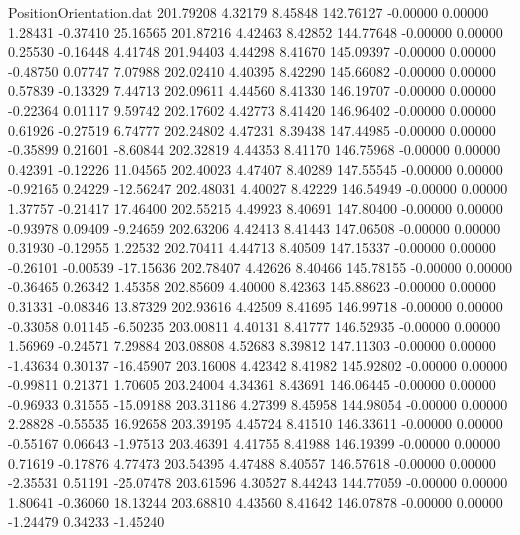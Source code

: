 \begin{filecontents}{PositionOrientation.dat}
 201.79208    4.32179    8.45848   142.76127   -0.00000    0.00000    1.28431   -0.37410   25.16565
 201.87216    4.42463    8.42852   144.77648   -0.00000    0.00000    0.25530   -0.16448    4.41748
 201.94403    4.44298    8.41670   145.09397   -0.00000    0.00000   -0.48750    0.07747    7.07988
 202.02410    4.40395    8.42290   145.66082   -0.00000    0.00000    0.57839   -0.13329    7.44713
 202.09611    4.44560    8.41330   146.19707   -0.00000    0.00000   -0.22364    0.01117    9.59742
 202.17602    4.42773    8.41420   146.96402   -0.00000    0.00000    0.61926   -0.27519    6.74777
 202.24802    4.47231    8.39438   147.44985   -0.00000    0.00000   -0.35899    0.21601   -8.60844
 202.32819    4.44353    8.41170   146.75968   -0.00000    0.00000    0.42391   -0.12226   11.04565
 202.40023    4.47407    8.40289   147.55545   -0.00000    0.00000   -0.92165    0.24229  -12.56247
 202.48031    4.40027    8.42229   146.54949   -0.00000    0.00000    1.37757   -0.21417   17.46400
 202.55215    4.49923    8.40691   147.80400   -0.00000    0.00000   -0.93978    0.09409   -9.24659
 202.63206    4.42413    8.41443   147.06508   -0.00000    0.00000    0.31930   -0.12955    1.22532
 202.70411    4.44713    8.40509   147.15337   -0.00000    0.00000   -0.26101   -0.00539  -17.15636
 202.78407    4.42626    8.40466   145.78155   -0.00000    0.00000   -0.36465    0.26342    1.45358
 202.85609    4.40000    8.42363   145.88623   -0.00000    0.00000    0.31331   -0.08346   13.87329
 202.93616    4.42509    8.41695   146.99718   -0.00000    0.00000   -0.33058    0.01145   -6.50235
 203.00811    4.40131    8.41777   146.52935   -0.00000    0.00000    1.56969   -0.24571    7.29884
 203.08808    4.52683    8.39812   147.11303   -0.00000    0.00000   -1.43634    0.30137  -16.45907
 203.16008    4.42342    8.41982   145.92802   -0.00000    0.00000   -0.99811    0.21371    1.70605
 203.24004    4.34361    8.43691   146.06445   -0.00000    0.00000   -0.96933    0.31555  -15.09188
 203.31186    4.27399    8.45958   144.98054   -0.00000    0.00000    2.28828   -0.55535   16.92658
 203.39195    4.45724    8.41510   146.33611   -0.00000    0.00000   -0.55167    0.06643   -1.97513
 203.46391    4.41755    8.41988   146.19399   -0.00000    0.00000    0.71619   -0.17876    4.77473
 203.54395    4.47488    8.40557   146.57618   -0.00000    0.00000   -2.35531    0.51191  -25.07478
 203.61596    4.30527    8.44243   144.77059   -0.00000    0.00000    1.80641   -0.36060   18.13244
 203.68810    4.43560    8.41642   146.07878   -0.00000    0.00000   -1.24479    0.34233   -1.45240

\end{filecontents}

